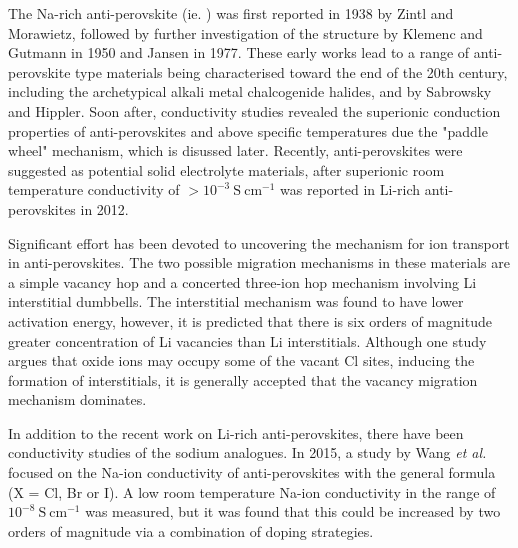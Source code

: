 \documentclass[12pt]{report}
\begin{document}
The Na-rich anti-perovskite  (ie. ) was first reported in 1938 by Zintl and Morawietz,\cite{zintl1938} followed by further investigation of the structure by Klemenc and Gutmann in 1950\cite{klemenc1950} and Jansen in 1977.\cite{jansen1977}
These early works lead to a range of anti-perovskite type materials being characterised toward the end of the 20th century,\cite{fanfani1980, hippler1990b, sabrowsky1990, hippler1990c} including the archetypical alkali metal chalcogenide halides,  and  by Sabrowsky and Hippler.\cite{sabrowsky1988, hippler1990}
Soon after, conductivity studies revealed the superionic conduction properties of anti-perovskites  and  above specific temperatures due the "paddle wheel" mechanism, which is disussed later. \cite{muller1990, jansen1992}
Recently, anti-perovskites were suggested as potential solid electrolyte materials, after superionic room temperature conductivity of $>10^{-3} \ \mathrm{S \ cm^{-1}}$ was reported in Li-rich anti-perovskites in 2012.\cite{zhao2012, reckeweg2012}

Significant effort has been devoted to uncovering the mechanism for ion transport in anti-perovskites.
The two possible migration mechanisms in these materials are a simple vacancy hop and a concerted three-ion hop mechanism involving Li interstitial dumbbells.
The interstitial mechanism was found to have lower activation energy, however, it is predicted that there is six orders of magnitude greater concentration of Li vacancies than Li interstitials.
Although one study argues that oxide ions may occupy some of the vacant Cl sites, inducing the formation of interstitials,\cite{mouta2016} it is generally accepted that the vacancy migration mechanism dominates.\cite{emly2013, zhang2013, mouta2014, lu2015}

In addition to the recent work on Li-rich anti-perovskites,\cite{dawson2018a, clarke2021, shen2020} there have been conductivity studies of the sodium analogues.
In 2015, a study by Wang \textit{et al.} focused on the Na-ion conductivity of anti-perovskites with the general formula  (X = Cl, Br or I).
A low room temperature Na-ion conductivity in the range of $10^{-8} \ \mathrm{S \ cm^{-1}}$ was measured, but it was found that this could be increased by two orders of magnitude via a combination of doping strategies.\cite{wang2015a}
\end{document}
